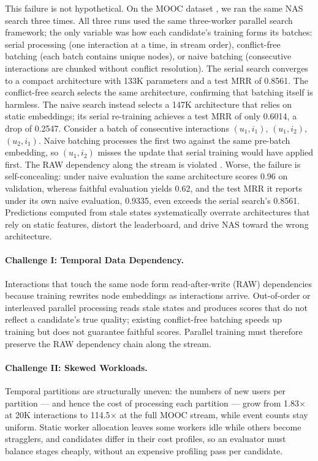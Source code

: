 \documentclass[sigconf, nonacm]{acmart}
\begin{document}
This failure is not hypothetical. On the MOOC dataset \cite{mooc}, we
ran the same NAS search three times. All three runs used the same
three-worker parallel search framework; the only variable was how each
candidate's training forms its batches: serial processing (one
interaction at a time, in stream order), conflict-free batching (each
batch contains unique nodes), or naive batching (consecutive
interactions are chunked without conflict resolution). The serial
search converges to a compact architecture with 133K parameters and a
test MRR of 0.8561. The conflict-free search selects the same
architecture, confirming that batching itself is harmless. The naive
search instead selects a 147K architecture that relies on static
embeddings; its serial re-training achieves a test MRR of only 0.6014,
a drop of 0.2547. Consider a batch of consecutive interactions
$(u_1,i_1)$, $(u_1,i_2)$, $(u_2,i_1)$. Naive batching processes the
first two against the same pre-batch embedding, so $(u_1,i_2)$ misses
the update that serial training would have applied first. The RAW
dependency along the stream is violated \cite{jodie}.
Worse, the failure is self-concealing: under naive evaluation the same
architecture scores 0.96 on validation, whereas faithful evaluation
yields 0.62, and the test MRR it reports under its own naive
evaluation, 0.9335, even exceeds the serial search's 0.8561.
Predictions computed from stale states systematically overrate
architectures that rely on static features, distort the leaderboard,
and drive NAS toward the wrong architecture.

\paragraph{Challenge I: Temporal Data Dependency.}
Interactions that touch the same node form read-after-write (RAW)
dependencies because training rewrites node embeddings as interactions
arrive. Out-of-order or interleaved parallel processing reads stale
states and produces scores that do not reflect a candidate's true
quality; existing conflict-free batching speeds up training but does
not guarantee faithful scores. Parallel training must therefore
preserve the RAW dependency chain along the stream.

\paragraph{Challenge II: Skewed Workloads.}
Temporal partitions are structurally uneven: the numbers of new users
per partition --- and hence the cost of processing each partition ---
grow from 1.83$\times$ at 20K interactions to 114.5$\times$ at the
full MOOC stream, while event counts stay uniform. Static worker
allocation leaves some workers idle while others become stragglers,
and candidates differ in their cost profiles, so an evaluator must
balance stages cheaply, without an expensive profiling pass per
candidate.
\end{document}

